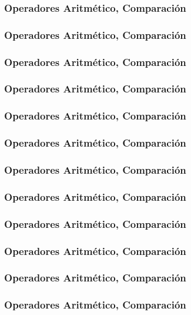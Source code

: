 \documentclass{beamer}
\begin{document}
\begin{frame}
\frametitle{Operadores Aritmético, Comparación}

\end{frame}

\begin{frame}
\frametitle{Operadores Aritmético, Comparación}

\end{frame}

\begin{frame}
\frametitle{Operadores Aritmético, Comparación}

\end{frame}

\begin{frame}
\frametitle{Operadores Aritmético, Comparación}

\end{frame}

\begin{frame}
\frametitle{Operadores Aritmético, Comparación}

\end{frame}

\begin{frame}
\frametitle{Operadores Aritmético, Comparación}

\end{frame}

\begin{frame}
\frametitle{Operadores Aritmético, Comparación}

\end{frame}

\begin{frame}
\frametitle{Operadores Aritmético, Comparación}

\end{frame}

\begin{frame}
\frametitle{Operadores Aritmético, Comparación}

\end{frame}

\begin{frame}
\frametitle{Operadores Aritmético, Comparación}

\end{frame}

\begin{frame}
\frametitle{Operadores Aritmético, Comparación}

\end{frame}

\begin{frame}
\frametitle{Operadores Aritmético, Comparación}

\end{frame}
\end{document}
